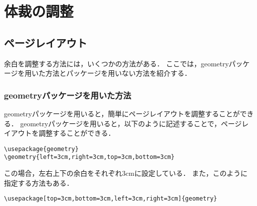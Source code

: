 \section{体裁の調整}
\subsection{ページレイアウト}
余白を調整する方法には，いくつかの方法がある．
ここでは，geometryパッケージを用いた方法とパッケージを用いない方法を紹介する．
\subsubsection{geometryパッケージを用いた方法}
geometryパッケージを用いると，簡単にページレイアウトを調整することができる．
geometryパッケージを用いると，以下のように記述することで，ページレイアウトを調整することができる．
\begin{lstlisting}
\usepackage{geometry}
\geometry{left=3cm,right=3cm,top=3cm,bottom=3cm}
\end{lstlisting}
この場合，左右上下の余白をそれぞれ3cmに設定している．
また，このように指定する方法もある．
\begin{lstlisting}
\usepackage[top=3cm,bottom=3cm,left=3cm,right=3cm]{geometry}
\end{lstlisting}

